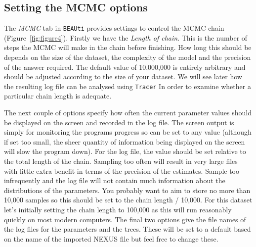 \documentclass[cup7b, english]{cupbook}
\begin{document}
\subsection{Setting the MCMC options}
\label{MCMC_options}

The {\it MCMC} tab in \texttt{BEAUti} provides settings to control the MCMC chain (Figure~\ref{fig:figure4}). Firstly we have the
{\it Length of chain}. This is the number of steps the MCMC will make in the chain before
finishing. How long this should be depends on the size of the dataset, the complexity of the
model and the precision of the answer required. The default value of 10,000,000 is entirely
arbitrary and should be adjusted according to the size of your dataset. We will see later how
the resulting log file can be analysed using \texttt{Tracer} In order to examine whether a particular 
chain length is adequate.

The next couple of options specify how often the current parameter values should be displayed
on the screen and recorded in the log file. The screen output is simply for monitoring the
programs progress so can be set to any value (although if set too small, the sheer quantity
of information being displayed on the screen will slow the program down). For the log
file, the value should be set relative to the total length of the chain. Sampling too often
will result in very large files with little extra benefit in terms of the precision of the
estimates. Sample too infrequently and the log file will not contain much information about
the distributions of the parameters. You probably want to aim to store no more than 10,000
samples so this should be set to the chain length / 10,000. For this dataset let's initially
setting the chain length to 100,000 as this will run reasonably quickly on most modern
computers. The final two options give the file names of the log files for the parameters and the trees.
These will be set to a default based on the name of the imported NEXUS file but feel free
to change these.
\end{document}
